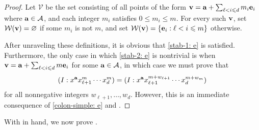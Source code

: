 \documentclass[11pt]{amsart}
\begin{document}
\begin{proof}
Let $\mathcal{V}$ be the set consisting of all points of the form $\mathbf{v} = \mathbf{a} + \sum_{\ell <i \leqslant d} m_i \mathbf{e}_i$ where $\mathbf{a} \in \mathcal{A}$, and each integer $m_i$ satisfies $0 \leq m_i \leq m$.  For every such $\mathbf{v}$, set $\mathcal{W}(\mathbf{v}) = \varnothing$ if some $m_i$ is not $m$, and set $\mathcal{W}(\mathbf{v}) = \{ \mathbf{e}_i : \ell < i \leqslant m \}$ otherwise.


After unraveling these definitions, it is obvious that \eqref{stab-1: e} is satisfied.  Furthermore, the only case in which \eqref{stab-2: e} is nontrivial is when $\mathbf{v} = \mathbf{a} + \sum_{\ell <i \leqslant d} m \mathbf{e}_i$ for some $\mathbf{a} \in \mathcal{A}$,  in which case we must prove that
%
\[( I : x^{\mathbf{a}} x_{\ell+1}^m \cdots x_{d}^m ) =   ( I : x^{\mathbf{a}} x_{\ell+1}^{m+w_{\ell+1}} \cdots x_{d}^{m+w_m}) \]
for all nonnegative integers $w_{\ell+1}, \ldots, w_{d}$.  However, this is an immediate consequence of \eqref{colon-simple: e} and .
\end{proof}

With  in hand, we now prove .
\end{document}
